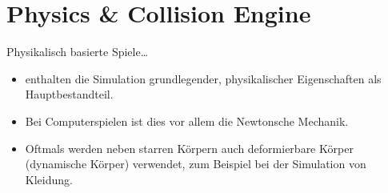     \section{Physics \& Collision Engine} %
        Physikalisch basierte Spiele\dots
        \begin{itemize}
        	\item enthalten die Simulation grundlegender, physikalischer Eigenschaften als Hauptbestandteil.
        	\item Bei Computerspielen ist dies vor allem die Newtonsche Mechanik.
        	\item Oftmals werden neben starren Körpern auch deformierbare Körper (dynamische Körper) verwendet, zum Beispiel bei der Simulation von Kleidung.
        \end{itemize}
        
